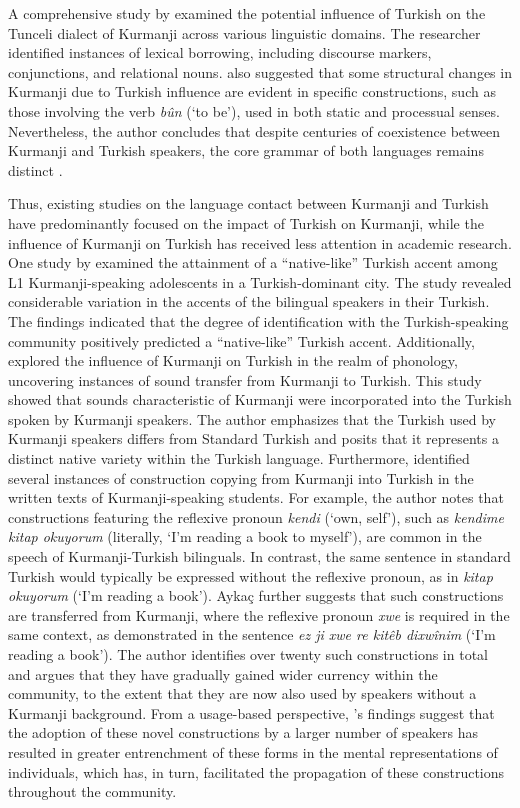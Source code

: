 A comprehensive study by \citet{Haig2007} examined the potential influence of Turkish on the Tunceli dialect of Kurmanji across various linguistic domains. The researcher identified instances of lexical borrowing, including discourse markers, conjunctions, and relational nouns. \citet{Haig2007} also suggested that some structural changes in Kurmanji due to Turkish influence are evident in specific constructions, such as those involving the verb \textit{bûn} (‘to be’), used in both static and processual senses. Nevertheless, the author concludes that despite centuries of coexistence between Kurmanji and Turkish speakers, the core grammar of both languages remains distinct \citep{Haig2007}.

\largerpage
Thus, existing studies on the language contact between Kurmanji and Turkish have predominantly focused on the impact of Turkish on Kurmanji, while the influence of Kurmanji on Turkish has received less attention in academic research. One study by \citet{PolatSchallert2013} examined the attainment of a “native-like” Turkish accent among L1 Kurmanji-speaking adolescents in a Turkish-dominant city. The study revealed considerable variation in the accents of the bilingual speakers in their Turkish. The findings indicated that the degree of identification with the Turkish-speaking community positively predicted a “native-like” Turkish accent. Additionally, \citet{Yonat2023} explored the influence of Kurmanji on Turkish in the realm of phonology, uncovering instances of sound transfer from Kurmanji to Turkish. This study showed that sounds characteristic of Kurmanji were incorporated into the Turkish spoken by Kurmanji speakers. The author emphasizes that the Turkish used by Kurmanji speakers differs from Standard Turkish and posits that it represents a distinct native variety within the Turkish language. Furthermore, \citet{Aykac2016} identified several instances of construction copying from Kurmanji into Turkish in the written texts of Kurmanji-speaking students. For example, the author notes that constructions featuring the reflexive pronoun \textit{kendi} (‘own, self’), such as \textit{kendime kitap okuyorum} (literally, ‘I’m reading a book to myself’), are common in the speech of Kurmanji-Turkish bilinguals. In contrast, the same sentence in standard Turkish would typically be expressed without the reflexive pronoun, as in \textit{kitap okuyorum} (‘I’m reading a book’). Aykaç further suggests that such constructions are transferred from Kurmanji, where the reflexive pronoun \textit{xwe} is required in the same context, as demonstrated in the sentence \textit{ez ji xwe re kitêb dixwînim} (‘I’m reading a book’). The author identifies over twenty such constructions in total and argues that they have gradually gained wider currency within the community, to the extent that they are now also used by speakers without a Kurmanji background. From a usage-based perspective, \citet{Aykac2016}'s findings suggest that the adoption of these novel constructions by a larger number of speakers has resulted in greater entrenchment of these forms in the mental representations of individuals, which has, in turn, facilitated the propagation of these constructions throughout the community.

